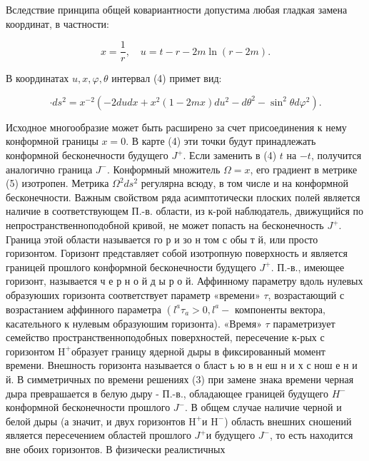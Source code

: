 \documentclass[10pt]{article}
\begin{document}
Вследствие принципа общей ковариантности допустима любая гладкая замена координат, в частности:



\[

x=\frac{1}{r}, \quad u=t-r-2 m \ln (r-2 m) .

\]



В координатах $u, x, \varphi, \theta$ интервал (4) примет вид:



\[

\cdot d s^{2}=x^{-2}\left(-2 d u d x+x^{2}(1-2 m x) d u^{2}-d \theta^{2}-\sin ^{2} \theta d \varphi^{2}\right) .

\]



Исходное многообразие может быть расширено за счет присоединения к нему конформной границы $x=0$. В карте (4) эти точки будут принадлежать конформной бесконечности будущего $J^{+}$. Если заменить в (4) $t$ на $-t$, получится аналогично граница $J^{-}$. Конформный множитель $\Omega=x$, его градиент в метрике (5) изотропен. Метрика $\Omega^{2} d s^{2}$ регулярна всюду, в том числе и на конформной бесконечности. Важным свойством ряда асимптотически плоских полей является наличие в соответствующем П.-в. области, из к-рой наблюдатель, движущийся по непространственноподобной кривой, не может попасть на бесконечность $J^{+}$. Граница этой области называется го р и зо н том с обы т й, или просто горизонтом. Горизонт представляет собой изотропную поверхность и является границей прошлого конформной бесконечности будущего $J^{+}$. П.-в., имеющее горизонт, называется ч е р н о й д ы р о й. Аффинному параметру вдоль нулевых образуюших горизонта соответствует параметр «времени» $\tau$, возрастающий с возрастанием аффинного параметра $\left(l^{a} \tau_{a}>0, l^{a}-\right.$ компоненты вектора, касательного к нулевым образуюшим горизонта). «Время» $\tau$ параметризует семейство пространственноподобных поверхностей, пересечение к-рых с горизонтом $\mathrm{H}^{+}$образует границу ядерной дыры в фиксированный момент времени. Внешность горизонта называется о бласт ь ю в н еш н и х с нош е н и й. В симметричных по времени решениях (3) при замене знака времени черная дыра преврашается в белую дыру - П.-в., обладающее границей будущего $H^{-}$ конформной бесконечности прошлого $J^{-}$. В общем случае наличие черной и белой дыры (а значит, и двух горизонтов $\mathrm{H}^{+}$и $\mathrm{H}^{-}$) область внешних сношений является пересечением областей прошлого $J^{+}$и будущего $J^{-}$, то есть находится вне обоих горизонтов. В физически реалистичных
\end{document}
